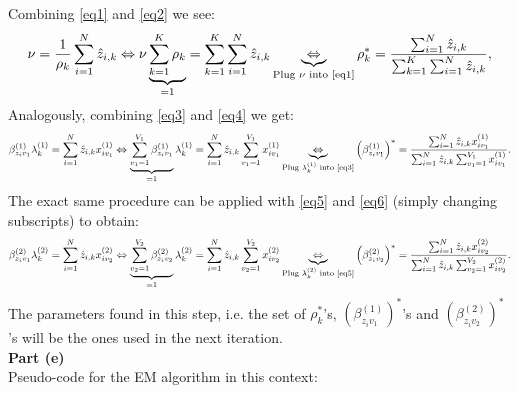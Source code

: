 \documentclass[a4paper, 11pt]{article}
\begin{document}
Combining \eqref{eq1} and \eqref{eq2} we see:
\begin{eqnarray}
\nu = \frac{1}{\rho_k} \sum_{i=1}^{N} \hat{z}_{i,k} \Leftrightarrow \nu \underbrace{\sum_{k=1}^{K} \rho_k}_{=1} = \sum_{k=1}^{K} \sum_{i=1}^{N} \hat{z}_{i,k} \underbrace{\Leftrightarrow}_{\text{Plug $\nu$ into \eqref{eq1}}} \rho_k^{*} =  \frac{\sum_{i=1}^N \hat{z}_{i,k}}{\sum_{k=1}^{K} \sum_{i=1}^{N} \hat{z}_{i,k}}, \label{rhostar}
\end{eqnarray}
Analogously, combining \eqref{eq3} and \eqref{eq4} we get:
\begin{eqnarray}
\beta_{z_i v_1}^{(1)} \lambda_k^{(1)} = \sum_{i=1}^{N} \hat{z}_{i,k} x_{i v_1}^{(1)} \Leftrightarrow \underbrace{\sum_{v_1=1}^{V_1} \beta_{z_i v_1}^{(1)}}_{=1} \lambda_k^{(1)} = \sum_{i=1}^{N} \hat{z}_{i,k} \sum_{v_1=1}^{V_1} x_{i v_1}^{(1)} \underbrace{\Leftrightarrow}_{\text{Plug $\lambda_k^{(1)}$ into \eqref{eq3}}} \left(\beta_{z_i v_1}^{(1)}\right)^{*} = \frac{\sum_{i=1}^{N} \hat{z}_{i,k} x_{i v_1}^{(1)}}{\sum_{i=1}^{N} \hat{z}_{i,k} \sum_{v_1=1}^{V_1} x_{i v_1}^{(1)}}.  \label{beta1star}
\end{eqnarray}
The exact same procedure can be applied with \eqref{eq5} and \eqref{eq6} (simply changing subscripts) to obtain:
\begin{eqnarray}
\beta_{z_i v_1}^{(2)} \lambda_k^{(2)} = \sum_{i=1}^{N} \hat{z}_{i,k} x_{i v_2}^{(2)} \Leftrightarrow \underbrace{\sum_{v_2=1}^{V_2} \beta_{z_i v_2}^{(2)}}_{=1} \lambda_k^{(2)} = \sum_{i=1}^{N} \hat{z}_{i,k} \sum_{v_2=1}^{V_2} x_{i v_2}^{(2)} \underbrace{\Leftrightarrow}_{\text{Plug $\lambda_k^{(2)}$ into \eqref{eq5}}} \left(\beta_{z_i v_2}^{(2)} \right)^{*} = \frac{\sum_{i=1}^{N} \hat{z}_{i,k} x_{i v_2}^{(2)}}{\sum_{i=1}^{N} \hat{z}_{i,k} \sum_{v_2=1}^{V_2} x_{i v_2}^{(2)}}.  \label{beta2star}
\end{eqnarray}
The parameters found in this step, i.e. the set of $\rho_k^{*}$'s, $\left(\beta_{z_i v_1}^{(1)} \right)^{*}$'s and $\left(\beta_{z_i v_2}^{(2)} \right)^{*}$'s will be the ones used in the next iteration.\\
\newline \textbf{Part (e)}\\
\newline Pseudo-code for the EM algorithm in this context:
\end{document}
